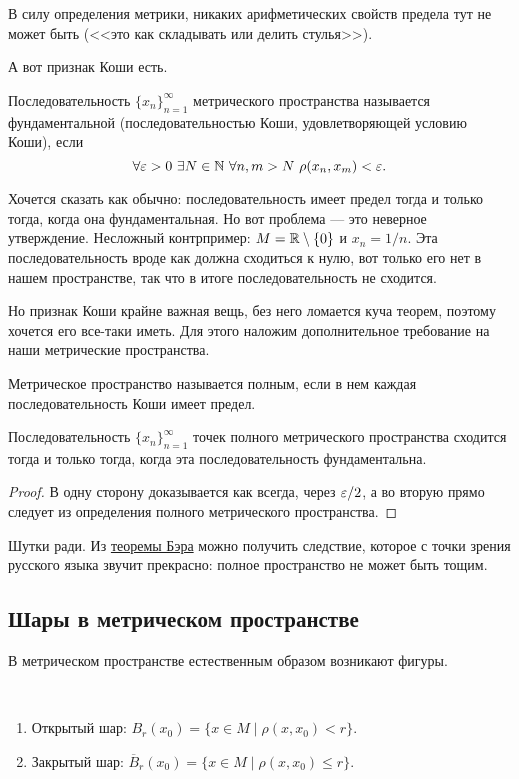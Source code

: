 \documentclass[a4paper, 12pt]{article}
\begin{document}
В силу определения метрики, никаких арифметических свойств предела тут не может быть (<<это как складывать или делить стулья>>).

А вот признак Коши есть.
\begin{Def}
Последовательность $\{x_n\}_{n=1}^\infty$ метрического пространства называется фундаментальной (последовательностью Коши, удовлетворяющей условию Коши), если
$$
\forall \varepsilon > 0 \ \exists N \in \mathbb{N}\ \forall n, m > N\ \rho(x_n, x_m) < \varepsilon.
$$
\end{Def}

Хочется сказать как обычно: последовательность имеет предел тогда и только тогда, когда она фундаментальная. Но вот проблема --- это неверное утверждение. Несложный контрпример: $M = \mathbb{R}\setminus\{0\}$ и $x_n = 1/n$. Эта последовательность вроде как должна сходиться к нулю, вот только его нет в нашем пространстве, так что в итоге последовательность не сходится.

Но признак Коши крайне важная вещь, без него ломается куча теорем, поэтому хочется его все-таки иметь. Для этого наложим дополнительное требование на наши метрические пространства.
\begin{Def}
Метрическое пространство называется полным, если в нем каждая последовательность Коши имеет предел.
\end{Def}

\begin{Theorem}
Последовательность $\{x_n\}_{n=1}^\infty$ точек полного метрического пространства сходится тогда и только тогда, когда эта последовательность фундаментальна.
\end{Theorem}
\begin{proof}
В одну сторону доказывается как всегда, через $\varepsilon/2$, а во вторую прямо следует из определения полного метрического пространства.
\end{proof}

\begin{Comment}
Шутки ради. Из \href{https://goo.gl/drRQz0}{теоремы Бэра} можно получить следствие, которое с точки зрения русского языка звучит прекрасно: полное пространство не может быть тощим.
\end{Comment}

\subsection*{Шары в метрическом пространстве}
В метрическом пространстве естественным образом возникают фигуры.
\begin{Def}\ 
\begin{enumerate}
\item Открытый шар: $B_r(x_0) = \{x \in M \mid \rho(x, x_0) < r  \}$.
\item Закрытый шар: $\overline{B}_r(x_0) = \{x \in M \mid \rho(x, x_0) \leq r  \}$.
\end{enumerate}
\end{Def}
\end{document}
